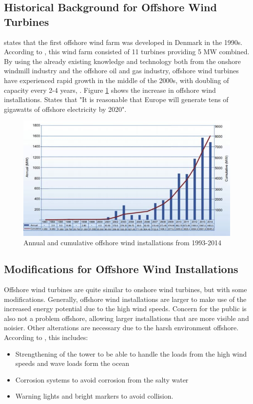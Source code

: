 \subsection{ Historical Background for Offshore Wind Turbines}
\cite{NG2016} states that the first offshore wind farm was developed in Denmark in the 1990s. According to \cite{Lynn2011}, this wind farm consisted of 11 turbines providing 5 MW combined.  By using the already existing knowledge and technology both from the onshore windmill industry and the offshore oil and gas industry, offshore wind turbines have experienced rapid growth in the middle of the 2000s, with doubling of capacity every 2-4 years, \cite{NG2016}. Figure \ref{fig:development} shows the increase in offshore wind installations. \cite{Lynn2011} States that "It is reasonable that Europe will generate tens of gigawatts of offshore electricity by 2020".


\begin{figure}[H]
\centering
\includegraphics[scale=1.1]{figures/development}
\caption[$\; \:$Annual and cumulative offshore wind installations from 1993-2014]{Annual and cumulative offshore wind installations from 1993-2014 \cite{NG2016}}
 \label{fig:development}
\end{figure}


\subsection{Modifications for Offshore Wind Installations}
Offshore wind turbines are quite similar to onshore wind turbines, but with some modifications. Generally, offshore wind installations are larger to make use of the increased energy potential due to the high wind speeds. Concern for the public is also not a problem offshore, allowing larger installations that are more visible and noisier. Other alterations are necessary due to the harsh environment offshore. According to \cite{Kapsali2012}, this includes:
\begin{itemize}
    \item Strengthening of the tower to be able to handle the loads from the high wind speeds and wave loads form the ocean
    \item Corrosion systems to avoid corrosion from the salty water
    \item Warning lights and bright markers to avoid collision. 
\end{itemize}

